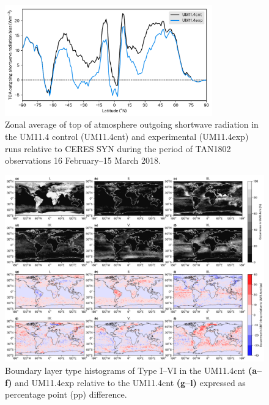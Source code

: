 \begin{figure}[p]
\centering
\includegraphics[width=0.8\textwidth]{chapter4/fig/sw_zonal.pdf}
\caption[Zonal average of top of atmosphere outgoing shortwave radiation]{
Zonal average of top of atmosphere outgoing shortwave radiation in
the UM11.4 control (UM11.4cnt) and experimental (UM11.4exp) runs relative
to CERES SYN during the period of TAN1802 observations 16 February--15 March 2018. 
}
\label{fig:4:sw-zonal}
\end{figure}

\begin{figure}[p]
\centering
\includegraphics[width=\textwidth]{chapter4/fig/bdyt.png}
\caption[Boundary layer type histograms]{Boundary layer type histograms of Type I--VI \citep{lock2000} in the UM11.4cnt
\textbf{(a--f)} and UM11.4exp relative to the UM11.4cnt \textbf{(g--l)} expressed as percentage point (pp)
difference.
}
\label{fig:4:bdyt}
\end{figure}

